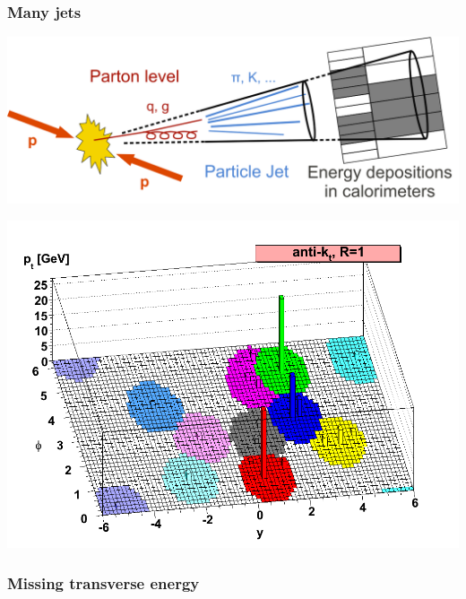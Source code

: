 \begin{frame}\frametitle{Many jets}
\centering

\begin{minipage}{.5\textwidth}\centering

\includegraphics[width=.78\textwidth]{pics/Sketch_PartonParticleCaloJet.png}

\end{minipage}\begin{minipage}{.5\textwidth}\centering
\includegraphics[width=.78\textwidth]{pics/antikt}

\end{minipage}


\end{frame}



\begin{frame}\frametitle{Missing transverse energy}
\centering\myskip

\end{frame}

